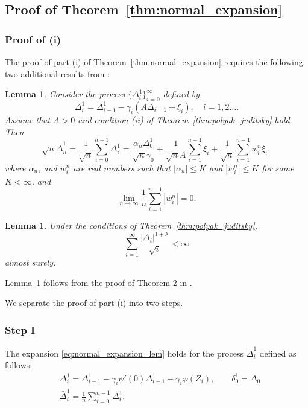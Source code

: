 \documentclass[letterpaper, 11pt]{IEEEtran}      %
\newtheorem{lem}[thm]{\bf {Lemma}}
\begin{document}
{\color{red}

\subsection{Proof of Theorem~\ref{thm:normal_expansion}
\label{proof:thm:normal_expansion}
}
\subsubsection*{Proof of (i)}
The proof of part (i) of Theorem~\ref{thm:normal_expansion} requires the following two additional results from \cite{polyak1992acceleration}:
\begin{lem}{\cite[Lem. 2]{polyak1992acceleration}}
\label{lem:Polyak_expansion}
Consider the process $\{\Delta_i^1 \}_{i=0}^\infty$ defined by
\[
\Delta^1_i = \Delta^1_{i-1} - \gamma_i (A \Delta_{i-1}+ \xi_i),\quad i=1,2\ldots.
\]
Assume that $A>0$ and condition (ii) of Theorem~\ref{thm:polyak_juditsky} hold. Then 
\begin{equation}
\label{eq:Polyak_expansion}
\sqrt{n} \bar{\Delta}_n^1 = \frac{1}{\sqrt{n}}\sum_{i=0}^{n-1} \Delta_i^1 = \frac{\alpha_n \Delta_0^1}{\sqrt{n} \gamma_0}  + \frac{1}{\sqrt{n} A} \sum_{i=1}^{n-1} \xi_i + \frac{1}{\sqrt{n}}\sum_{i=1}^{n-1} w_i^n \xi_i,
\end{equation}
where $\alpha_n$, and $w_i^n$ are real numbers such that $|\alpha_n| \leq K$ and $|w_i^n|\leq K$ for some $K< \infty$, and 
\[
\lim_{n\to \infty} \frac{1}{n} \sum_{i=1}^{n-1} |w_i^n| = 0. 
\]
\end{lem} 

\begin{lem} \label{lem:PJ_converging_sum}
Under the conditions of Theorem~\ref{thm:polyak_juditsky},
\[
\sum_{i=1}^\infty \frac{|\Delta_{i}|^{1+\lambda}}{\sqrt{i}} < \infty 
\]
almost surely. 
\end{lem}
Lemma~\ref{lem:PJ_converging_sum} follows from the proof of Theorem 2 in \cite{polyak1992acceleration}. 

We separate the proof of part (i) into two steps.
\subsubsection*{Step I}
The expansion \eqref{eq:normal_expansion_lem} holds for the process  ${\bar{\Delta}^1_i}$ defined as follows:
\begin{align} \label{eq:Polyak_expansion_lem1_alg}
& \Delta_i^1  = \Delta_{i-1}^1 - \gamma_i \psi'(0) \Delta_{i-1}^1 - \gamma_i \varphi(Z_i), \qquad
 \delta_0^1 = \Delta_0\\
& \bar{\Delta}^1_i = \frac{1}{n}\sum_{i=0}^{n-1} \Delta^1_i.
\end{align}

}
\end{document}
